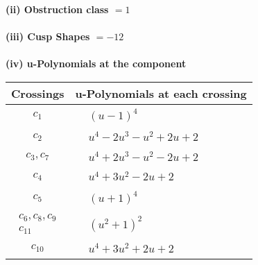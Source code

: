 \documentclass[1p]{elsarticle_modified}
\theoremstyle{definition}
\begin{document}
\flushleft \textbf{(ii) Obstruction class $= 1$}\\~\\
\flushleft \textbf{(iii) Cusp Shapes $= -12$}\\~\\
\newpage\renewcommand{\arraystretch}{1}
\flushleft \textbf{(iv) u-Polynomials at the component}\newline \\
\begin{tabular}{m{50pt}|m{274pt}}
Crossings & \hspace{64pt}u-Polynomials at each crossing \\
\hline $$\begin{aligned}c_{1}\end{aligned}$$&$\begin{aligned}
&(u-1)^4
\end{aligned}$\\
\hline $$\begin{aligned}c_{2}\end{aligned}$$&$\begin{aligned}
&u^4-2 u^3- u^2+2 u+2
\end{aligned}$\\
\hline $$\begin{aligned}c_{3},c_{7}\end{aligned}$$&$\begin{aligned}
&u^4+2 u^3- u^2-2 u+2
\end{aligned}$\\
\hline $$\begin{aligned}c_{4}\end{aligned}$$&$\begin{aligned}
&u^4+3 u^2-2 u+2
\end{aligned}$\\
\hline $$\begin{aligned}c_{5}\end{aligned}$$&$\begin{aligned}
&(u+1)^4
\end{aligned}$\\
\hline $$\begin{aligned}c_{6},c_{8},c_{9}\\c_{11}\end{aligned}$$&$\begin{aligned}
&(u^2+1)^2
\end{aligned}$\\
\hline $$\begin{aligned}c_{10}\end{aligned}$$&$\begin{aligned}
&u^4+3 u^2+2 u+2
\end{aligned}$\\
\hline
\end{tabular}\\~\\
\end{document}
